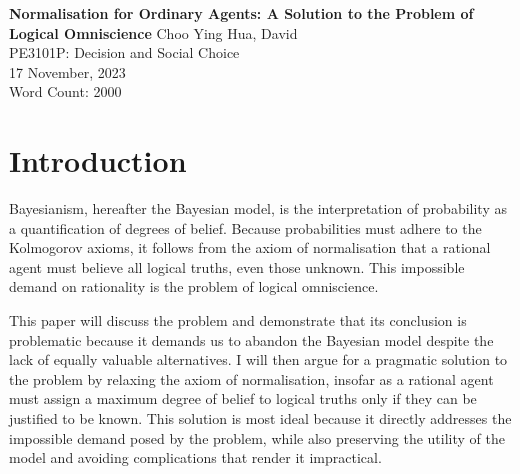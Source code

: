 \documentclass[12pt]{article}
\renewcommand{\maketitle}{%
    \begin{titlepage}
        \begin{center}
            \vfill
            \vspace*{\baselineskip}
            \vfill
            \textbf{Normalisation for Ordinary Agents: A Solution to the Problem of Logical Omniscience}
            \vfill
            Choo Ying Hua, David\\
            PE3101P: Decision and Social Choice\\
            17 November, 2023\\
            Word Count: 2000
            \vfill
        \end{center}
    \end{titlepage}
    }
\begin{document}
\maketitle
\section{Introduction}
Bayesianism, hereafter the Bayesian model, is the interpretation of probability as a quantification of degrees of belief. Because probabilities must adhere to the Kolmogorov axioms, it follows from the axiom of normalisation that a rational agent must believe all logical truths, even those unknown. This impossible demand on rationality is the problem of logical omniscience.

This paper will discuss the problem and demonstrate that its conclusion is problematic because it demands us to abandon the Bayesian model despite the lack of equally valuable alternatives. I will then argue for a pragmatic solution to the problem by relaxing the axiom of normalisation, insofar as a rational agent must assign a maximum degree of belief to logical truths only if they can be justified to be known. This solution is most ideal because it directly addresses the impossible demand posed by the problem, while also preserving the utility of the model and avoiding complications that render it impractical.
\end{document}
